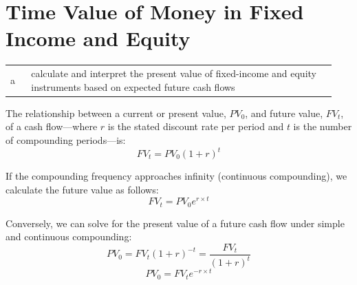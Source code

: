 
\section{Time Value of Money in Fixed Income and Equity}
\label{sec:Time Value of Money in Fixed Income and Equity}
\begin{center}
\begin{tabular}{p{0.06\linewidth} | p{0.88\linewidth}}
	a & calculate and interpret the present value of fixed-income and equity instruments based on expected future cash flows \\
\end{tabular}
\end{center}

The relationship between a current or present value, $PV_0$, and future value, $FV_t$, of a cash flow—where $r$ is the stated discount rate per period and $t$ is the number of compounding periods—is:
\begin{equation}
	FV_t = PV_0 (1 + r)^t
	\label{eq:fv_simple_m4}
\end{equation}

If the compounding frequency approaches infinity (continuous compounding), we calculate the future value as follows:
\begin{equation}
	FV_t = PV_0 e^{r \times t}
	\label{eq:fv_continuous_m4}
\end{equation}

Conversely, we can solve for the present value of a future cash flow under simple and continuous compounding:
\begin{equation}
	PV_0 = FV_t (1 + r)^{-t} = \frac{FV_t}{(1 + r)^t}
	\label{eq:pv_simple_m4}
\end{equation}
\begin{equation}
	PV_0 = FV_t e^{-r \times t}
	\label{eq:pv_continuous_m4}
\end{equation}

